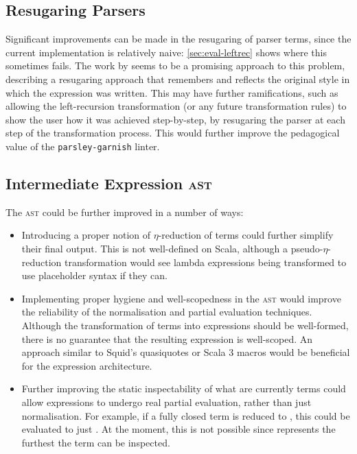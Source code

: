 \documentclass[../../main.tex]{subfiles}
\begin{document}
\subsection{Resugaring Parsers}
Significant improvements can be made in the resugaring of parser terms, since the current implementation is relatively naive: \cref{sec:eval-leftrec} shows where this sometimes fails.
The work by \textcite{pombrio_hygienic_2015} seems to be a promising approach to this problem, describing a resugaring approach that remembers and reflects the original style in which the expression was written.
This may have further ramifications, such as allowing the left-recursion transformation (or any future transformation rules) to show the user how it was achieved step-by-step, by resugaring the parser at each step of the transformation process.
This would further improve the pedagogical value of the \texttt{parsley-garnish} linter.

\subsection{Intermediate Expression \textsc{ast}}
The  \textsc{ast} could be further improved in a number of ways:
\begin{itemize}
  \item Introducing a proper notion of $\eta$-reduction of  terms could further simplify their final output. This is not well-defined on Scala, although a pseudo-$\eta$-reduction transformation would see lambda expressions being transformed to use placeholder syntax if they can.
  \item Implementing proper hygiene and well-scopedness in the  \textsc{ast} would improve the reliability of the normalisation and partial evaluation techniques. Although the transformation of terms into expressions should be well-formed, there is no guarantee that the resulting expression is well-scoped. An approach similar to Squid's quasiquotes or Scala 3 macros would be beneficial for the expression architecture.
  \item Further improving the static inspectability of what are currently  terms could allow expressions to undergo real partial evaluation, rather than just normalisation. For example, if a fully closed term is reduced to , this could be evaluated to just . At the moment, this is not possible since  represents the furthest the term can be inspected.
\end{itemize}
\end{document}
